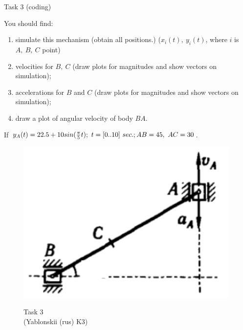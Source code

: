 \documentclass[aspectratio=169]{beamer}
\newcommand{\fbckg}[1]{\usebackgroundtemplate{\texttt{[image: \#1]}}}%
\begin{document}
\begin{frame}[t]{Task 3 (coding)}
    \begin{minipage}{0.6\textwidth}
        You should find:
        \begin{enumerate}
            \item simulate this mechanism (obtain all positions.) ($x_i(t),\ y_i(t)$, where $i$ is $A,\ B,\ C$ point)
            \item velocities for $B,\ C$ (draw plots for magnitudes and show vectors on simulation);
            \item accelerations for $B$ and $C$ (draw plots for magnitudes and show vectors on simulation);
            \item draw a plot of angular velocity of body $BA$.
        \end{enumerate}
        If $ y_A(t)=22.5+10sin(\frac{\pi}{5}t);\ t = [0..10]\ sec.;\\ AB=45,\ AC=30$.  \\
        \end{minipage}
        \begin{minipage}{0.39\textwidth}
              \begin{figure}[H]
            \includegraphics[width=0.99\textwidth]{HW1_4_old.png}\\
            \caption*{Task 3 \\ (Yablonskii (rus) K3)}
            \end{figure}
        \end{minipage}
\end{frame}

\fbckg{fibeamer/figs/last_page.png}
\frame[plain]{}
\end{document}
